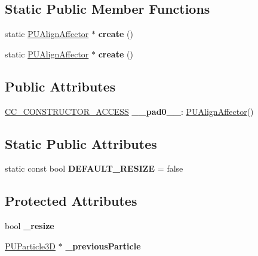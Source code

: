 \subsection*{Static Public Member Functions}
\begin{DoxyCompactItemize}
\item 
\mbox{\label{classPUAlignAffector_a756b56eeb759968cc6a709bbeb658862}} 
static \hyperlink{classPUAlignAffector}{P\+U\+Align\+Affector} $\ast$ {\bfseries create} ()
\item 
\mbox{\label{classPUAlignAffector_a73c79ae85f10b843218321e96a80505b}} 
static \hyperlink{classPUAlignAffector}{P\+U\+Align\+Affector} $\ast$ {\bfseries create} ()
\end{DoxyCompactItemize}
\subsection*{Public Attributes}
\begin{DoxyCompactItemize}
\item 
\mbox{\label{classPUAlignAffector_aa52c019cc50d9e1e252b2eaf06c77c19}} 
\hyperlink{_2cocos2d_2cocos_2base_2ccConfig_8h_a25ef1314f97c35a2ed3d029b0ead6da0}{C\+C\+\_\+\+C\+O\+N\+S\+T\+R\+U\+C\+T\+O\+R\+\_\+\+A\+C\+C\+E\+SS} {\bfseries \+\_\+\+\_\+pad0\+\_\+\+\_\+}\+: \hyperlink{classPUAlignAffector}{P\+U\+Align\+Affector}()
\end{DoxyCompactItemize}
\subsection*{Static Public Attributes}
\begin{DoxyCompactItemize}
\item 
\mbox{\label{classPUAlignAffector_a0a6efa622352dcf8f9c58db47982ba22}} 
static const bool {\bfseries D\+E\+F\+A\+U\+L\+T\+\_\+\+R\+E\+S\+I\+ZE} = false
\end{DoxyCompactItemize}
\subsection*{Protected Attributes}
\begin{DoxyCompactItemize}
\item 
\mbox{\label{classPUAlignAffector_ac2c1f2cbe928fb0d0094ff30f4b9a622}} 
bool {\bfseries \+\_\+resize}
\item 
\mbox{\label{classPUAlignAffector_aa9171b148ff50e7c4f9cf13c97e29500}} 
\hyperlink{structPUParticle3D}{P\+U\+Particle3D} $\ast$ {\bfseries \+\_\+previous\+Particle}
\end{DoxyCompactItemize}
